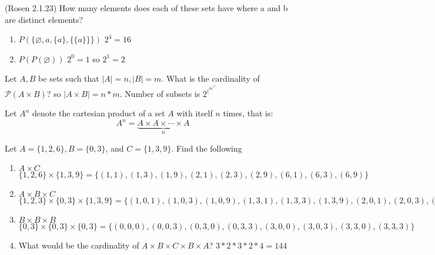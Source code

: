 \documentclass[10pt]{exam}
\begin{document}
\begin{questions}
 
 \question[2] (Rosen 2.1.23) How many elements does each of these sets have where a and b are distinct elements?
 \begin{enumerate} [label=(\alph*)]
 \item $P(\{\varnothing, a, \{a\}, \{\{a\}\}\})$
 \newline $ 2^4 = 16$
  \item $P(P(\varnothing))$
 \newline $ 2^0 = 1$ so $ 2^1 = 2$
 \end{enumerate}

\question[2] Let $A, B$ be sets such that $|A| = n, |B| = m$.  What is the cardinality of $\mathcal{P}(A \times B)$?
\newline so $|A \times B| = n * m$. Number of subsets is $2^(^m^*^n^)$

\question [4] Let $A^n$ denote the cartesian product of a set $A$ with itself $n$ times, that is:
  	$$A^n = \underbrace{A \times A \times \cdots \times A}_n$$

\question[8] Let $A = \{1, 2, 6\}, B =\{0, 3\}$, and $C = \{1,
3, 9\}$.  Find the following
\begin{enumerate} [label=(\alph*)]
 \item $A \times C$
 \newline $\{1,2,6\} \times \{1,3,9\} = \{(1,1),(1,3),(1,9),(2,1),(2,3),(2,9),(6,1),(6,3),(6,9)\}$
 \item $A \times B \times C$
 \newline $\{1,2,3\} \times \{0,3\} \times \{1,3,9\} = \{(1,0,1),(1,0,3),(1,0,9),(1,3,1),(1,3,3),(1,3,9),(2,0,1),(2,0,3),(2,0,9),(2,3,1),(2,3,3),(2,3,9),(3,0,1),(3,0,3),(3,0,9),(3,3,1),(3,3,3),(3,3,9)\}$
 \item $B \times B \times B$
 \newline $\{0,3\} \times \{0,3\} \times \{0,3\} = \{(0,0,0),(0,0,3),(0,3,0),(0,3,3),(3,0,0),(3,0,3),(3,3,0),(3,3,3)\}$
 \item What would be the cardinality of $A \times B \times C \times B \times A$?
 \newline $3 * 2 * 3 * 2 * 4 = 144$
\end{enumerate}


\end{questions}
\end{document}
